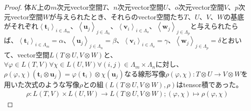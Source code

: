 \documentclass[dvipdfmx]{jsarticle}
\begin{document}
\begin{proof}
体$K$上の$m$次元vector空間$T$、$n$次元vector空間$U$、$o$次元vector空間$V$、$p$次元vector空間$W$が与えられたとき、それらのvector空間たち$T$、$U$、$V$、$W$の基底がそれぞれ$\left\langle \mathbf{t}_{i} \right\rangle_{i \in \varLambda_{m}}$、$\left\langle \mathbf{u}_{j} \right\rangle_{j \in \varLambda_{n}}$、$\left\langle \mathbf{v}_{i} \right\rangle_{i \in \varLambda_{o}}$、$\left\langle \mathbf{w}_{j} \right\rangle_{j \in \varLambda_{p}}$と与えられたらば、$\left\langle \mathbf{t}_{i} \right\rangle_{i \in \varLambda_{m}} = \alpha$、$\left\langle \mathbf{u}_{j} \right\rangle_{j \in \varLambda_{n}} = \beta$、$\left\langle \mathbf{v}_{i} \right\rangle_{i \in \varLambda_{o}} = \gamma$、$\left\langle \mathbf{w}_{j} \right\rangle_{j \in \varLambda_{p}} = \delta$とおいて、vector空間$L(T \otimes U,V \otimes W)$と、$\forall\varphi \in L(T,V)\forall\chi \in L(U,W)\forall(i,j) \in \varLambda_{m} \times \varLambda_{n}$に対し、$\rho(\varphi,\chi)\left( \mathbf{t}_{i} \otimes \mathbf{u}_{j} \right) = \varphi\left( \mathbf{t}_{i} \right) \otimes \chi\left( \mathbf{u}_{j} \right)$なる線形写像$\rho(\varphi,\chi):T \otimes U \rightarrow V \otimes W$を用いた次式のような写像$\rho$との組$\left( L(T \otimes U,V \otimes W),\rho \right)$はtensor積であった。
\begin{align*}
\rho:L(T,V) \times L(U,W) \rightarrow L(T \otimes U,V \otimes W);(\varphi,\chi) \mapsto \rho(\varphi,\chi)
\end{align*}

\end{proof}
\end{document}
